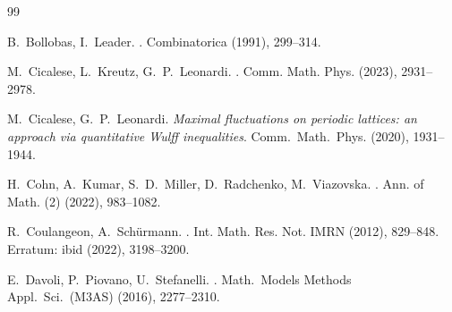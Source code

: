 \documentclass[reqno]{amsart}
\theoremstyle{plain}
\theoremstyle{definition}
\numberwithin{equation}{section}
\begin{document}
\begin{thebibliography}{99}
 
 


 
  



  
{\sc B.~Bollobas, I.~Leader}. 
. 
\newblock  Combinatorica
 (1991), 299--314.

  
  

 

  


  {\sc M.~Cicalese, L.~Kreutz, G.~P.~Leonardi}.
  .
  \newblock Comm. Math. Phys.
   (2023),   2931--2978.

 
 {\sc M.~Cicalese, G.~P.~Leonardi}. {\em Maximal fluctuations on periodic lattices: an approach via quantitative Wulff inequalities}.
 \newblock  Comm.\  Math.\ Phys. 
 (2020),  1931--1944.


    


  {\sc H.~Cohn, A.~Kumar, S.~D.~Miller, D.~Radchenko, M.~Viazovska}.
  .
  \newblock Ann. of Math. (2)
   (2022),  983--1082. 

    {\sc R.~Coulangeon, A.~Sch\"urmann}.
    .
    \newblock Int. Math. Res. Not. IMRN
    \newblock (2012),  
  829--848.
  Erratum: ibid (2022),   3198--3200.
  



     

{\sc E.~Davoli, P.~Piovano, U.~Stefanelli}. 
. 
\newblock Math.\ Models Methods Appl.\ Sci.\ (M3AS)
 (2016), 2277--2310.



\end{thebibliography}
\end{document}
